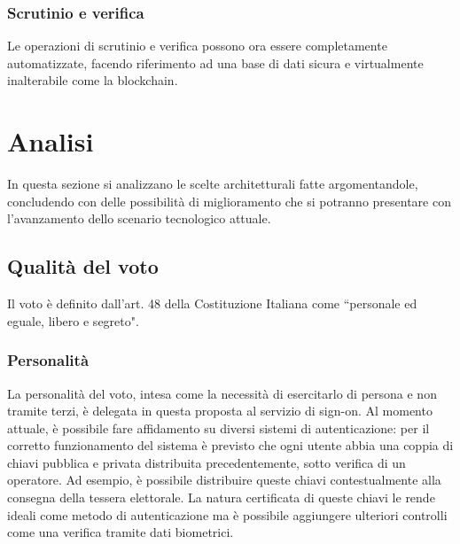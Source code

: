 		\subsubsection{Scrutinio e verifica}
			Le operazioni di scrutinio e verifica possono ora essere completamente automatizzate, facendo riferimento ad una base di dati sicura e virtualmente inalterabile come la blockchain.

\section{Analisi}
	In questa sezione si analizzano le scelte architetturali fatte argomentandole, concludendo con delle possibilità di miglioramento che si potranno presentare con l'avanzamento dello scenario tecnologico attuale.
	
	\subsection{Qualità del voto}
		Il voto è definito dall'art. 48 \cite{art48} della Costituzione Italiana come ``personale ed eguale, libero e segreto".
		\subsubsection{Personalità}\label{subsec:personalita_voto}
			La personalità del voto, intesa come la necessità di esercitarlo di persona e non tramite terzi, è delegata in questa proposta al servizio di sign-on. Al momento attuale, è possibile fare affidamento su diversi sistemi di autenticazione: per il corretto funzionamento del sistema è previsto che ogni utente abbia una coppia di chiavi pubblica e privata distribuita precedentemente, sotto verifica di un operatore. Ad esempio, è possibile distribuire queste chiavi contestualmente alla consegna della tessera elettorale. La natura certificata di queste chiavi le rende ideali come metodo di autenticazione ma è possibile aggiungere ulteriori controlli come una verifica tramite dati biometrici.
		
